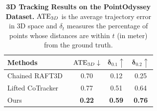 \begin{table}[t!]
\centering\small
\setlength{\tabcolsep}{9pt}
\begin{tabular}{lccc}
\toprule
 \textbf{Methods} & $\mathbf{\rm ATE}_{3D}\downarrow$ & $\mathbf{\delta_{0.1}}\uparrow$ & $\mathbf{\delta_{0.2}}\uparrow$ \\
\midrule
Chained RAFT3D~\cite{raft3D}  &  0.70 & 0.12  & 0.25 \\
Lifted CoTracker~\cite{cotracker}  & 0.77  & 0.51 & 0.64  \\
Ours  & \textbf{0.22} & \textbf{0.59}  & \textbf{0.76 } \\

\bottomrule
\end{tabular}
\vspace{-5pt}
\caption{\textbf{3D Tracking Results on the PointOdyssey Dataset.} ${\rm ATE}_{3D}$ is the average trajectory error in 3D space and
$\delta_{t}$ measures the percentage of points whose distances are within $t$ (in meter) from the ground truth.}
\label{table:PointOdyssey}
\end{table}
    
    